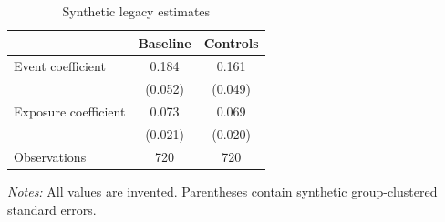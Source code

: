 \begin{table}[H]
\centering
\caption{Synthetic legacy estimates}
\label{tab:legacy}
\begin{tabular}{lcc}
\toprule
 & Baseline & Controls \\
\midrule
Event coefficient & 0.184 & 0.161 \\
 & (0.052) & (0.049) \\
Exposure coefficient & 0.073 & 0.069 \\
 & (0.021) & (0.020) \\
Observations & 720 & 720 \\
\bottomrule
\end{tabular}

\vspace{2pt}
\begin{minipage}{.82\textwidth}
\footnotesize\textit{Notes:} All values are invented. Parentheses contain
synthetic group-clustered standard errors.
\end{minipage}
\end{table}
